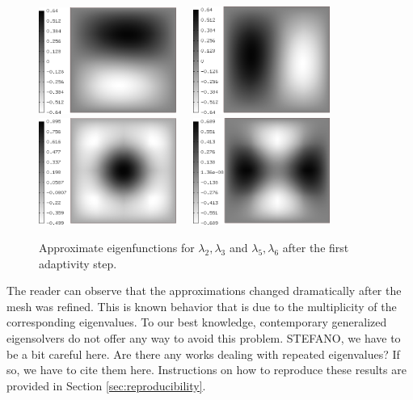 \documentclass[preprint,12pt]{elsarticle}
\begin{document}
\clearpage
\begin{figure}[!ht]
\begin{center}
\includegraphics[width=0.4\textwidth]{img/eigen_5.png}\ \ \ 
\includegraphics[width=0.4\textwidth]{img/eigen_6.png}\\[4mm]
\includegraphics[width=0.4\textwidth]{img/eigen_7.png}\ \ \ 
\includegraphics[width=0.4\textwidth]{img/eigen_8.png}\\
\end{center}
\vspace{-5mm}
\caption{Approximate eigenfunctions for $\lambda_2, \lambda_3$ and 
$\lambda_5, \lambda_6$ after the first adaptivity step.}
\label{fig:eigen2}
\end{figure}

The reader can observe that the approximations changed dramatically after the 
mesh was refined. This is known behavior that is due to the multiplicity of the 
corresponding eigenvalues. To our best knowledge, contemporary generalized 
eigensolvers do not offer any way to avoid this problem. 
{\red STEFANO, we have to be a bit careful here. Are there any works dealing 
with repeated eigenvalues? If so, we have to cite them here.}
Instructions on how to reproduce 
these results are provided in Section \ref{sec:reproducibility}.
\end{document}
